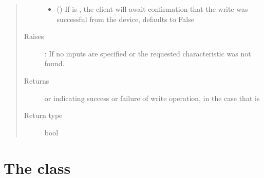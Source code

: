 \documentclass[letterpaper,10pt,english]{sphinxmanual}
\begin{document}
\begin{fulllineitems}
\begin{fulllineitems}
\begin{quote}
\begin{description}
\begin{itemize}
\item {} 
 (\sphinxstyleliteralemphasis{\sphinxupquote{, }}) \textendash{} If  is , the client will await confirmation that the write was successful from the device, defaults to False

\end{itemize}

\item[{Raises}] \leavevmode
{}: If no inputs are specified or the requested characteristic was not found.

\item[{Returns}] \leavevmode
{} or  indicating success or failure of write operation, in the case that  is 

\item[{Return type}] \leavevmode
bool

\end{description}\end{quote}

\end{fulllineitems}


\end{fulllineitems}



\section{The  class}
\label{\detokenize{PandaBot:the-PandaBotdevice-class}}
\end{document}

